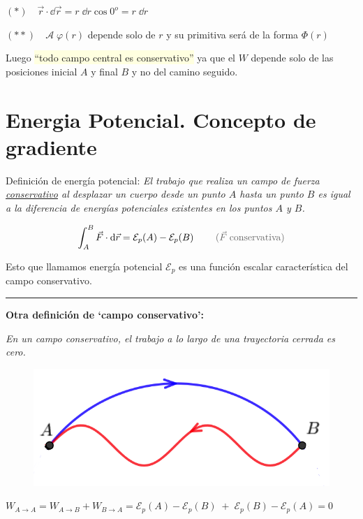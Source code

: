  \vspace{2mm}
 \textcolor{gris}{
 $(*)\quad \vec r\cdot \dd \vec r=r\;\dd r \cos 0^o=r\; \dd r $}
 
  \textcolor{gris}{
 $(**)\quad \mathcal A\; \varphi(r)$ depende solo de $r$ y su primitiva será de la forma $\Phi(r)$ }

Luego \colorbox{LightYellow}{``todo campo central es conservativo''} ya que el $W$ depende solo de las posiciones inicial $A$ y final $B$ y no del camino seguido.

\section{Energia Potencial. Concepto de gradiente}

 
\begin{miparrafo}
Definición de energía potencial: \emph{El trabajo que realiza un campo de fuerza \underline{conservativo} al desplazar un cuerpo desde un punto $A$ hasta un punto $B$ es igual a la diferencia de energías potenciales existentes en los puntos $A$ y $B$.}
\end{miparrafo}

\begin{equation}
\label{Ener-poten}
\int_A^B \vec F \cdot \dd \vec r = \mathcal E_p(A)- \mathcal E_p(B)\; \qquad \textcolor{gris}{(\vec F\; \text{conservativa})}	
\end{equation}

Esto que llamamos energía potencial $ \mathcal E_p$ es una función escalar característica del campo conservativo.

\rule{150pt}{0.4pt} 

\textbf{Otra definición de `campo conservativo':} 

\begin{multicols}{2}
\emph{En un campo conservativo, el trabajo a lo largo de una trayectoria cerrada es cero.}
\begin{figure}[H]
		\centering
		\includegraphics[width=.3\textwidth]{imagenes/imagenes03/T03IM11.png}
		\end{figure}
\end{multicols}

$W_{A\to A}=W_{A\to B}+W_{B \to A}=\mathcal E_p(A)-\mathcal E_p(B) \;+ \; \mathcal E_p(B)-\mathcal E_p(A)=0$

